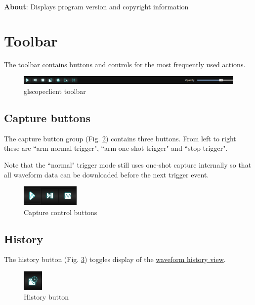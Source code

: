 \textbf{About}: Displays program version and copyright information

\section{Toolbar}

The toolbar contains buttons and controls for the most frequently used actions.

\begin{figure}[h]
\centering
\includegraphics[width=16cm]{images/toolbar.png}
\caption{glscopeclient toolbar}
\label{toolbar}
\end{figure}

\subsection{Capture buttons}

The capture button group (Fig. \ref{capturebuttons}) contains three buttons. From left to right these are ``arm
normal trigger", ``arm one-shot trigger" and ``stop trigger".

Note that the ``normal" trigger mode still uses one-shot capture internally so that all waveform data can be downloaded
before the next trigger event.

\begin{figure}[h]
\centering
\includegraphics[height=1cm]{images/capture-icons.png}
\caption{Capture control buttons}
\label{capturebuttons}
\end{figure}

\subsection{History}

The history button (Fig. \ref{historybutton}) toggles display of the \hyperref[sec:history]{waveform history view}.

\begin{figure}[h]
\centering
\includegraphics[height=1cm]{images/history-button.png}
\caption{History button}
\label{historybutton}
\end{figure}

